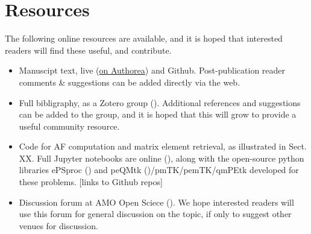 \section{Resources}\label{sec:resources}

The following online resources are available, and it is hoped that interested readers will find these useful, and contribute.

\begin{itemize}
\item Manuscipt text, live (\href{https://www.authorea.com/users/71114/articles/447808-extracting-molecular-frame-photoionization-dynamics-from-experimental-data}{on Authorea}) and \href{http://}{}Github. Post-publication reader comments \& suggestions can be added directly via the web.
\item Full bibligraphy, as a Zotero group (). Additional references and suggestions can be added to the group, and it is hoped that this will grow to provide a useful community resource.
\item Code for AF computation and matrix element retrieval, as illustrated in Sect. XX. Full Jupyter notebooks are online (), along with the open-source python libraries ePSproc () and peQMtk ()/pmTK/pemTK/qmPEtk developed for these problems. [links to Github repos]
\item Discussion forum at AMO Open Sciece (). We hope interested readers will use this forum for general discussion on the topic, if only to suggest other venues for discussion.
\end{itemize}